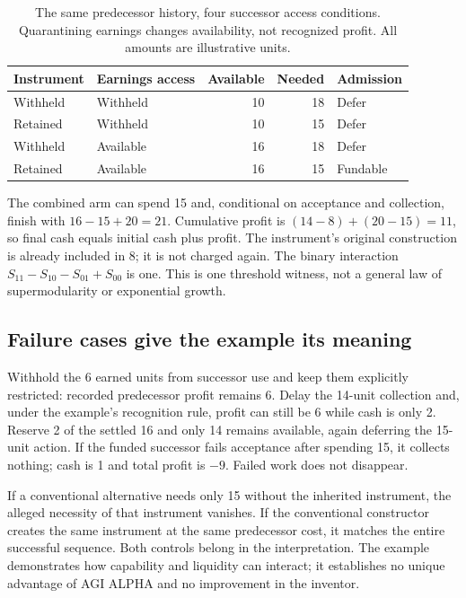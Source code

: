 \documentclass[10pt,a4paper]{article}
\begin{document}
\begin{table}[htbp]
\centering\small
\caption{The same predecessor history, four successor access conditions. Quarantining earnings changes availability, not recognized profit. All amounts are illustrative units.}
\label{tab:factorial}
\begin{tabular}{@{}llrrl@{}}
\toprule
\textbf{Instrument} & \textbf{Earnings access} & \textbf{Available} & \textbf{Needed} & \textbf{Admission}\\
\midrule
Withheld & Withheld & 10 & 18 & Defer\\
Retained & Withheld & 10 & 15 & Defer\\
Withheld & Available & 16 & 18 & Defer\\
Retained & Available & 16 & 15 & Fundable\\
\bottomrule
\end{tabular}
\end{table}

The combined arm can spend 15 and, conditional on acceptance and collection, finish with $16-15+20=21$. Cumulative profit is $(14-8)+(20-15)=11$, so final cash equals initial cash plus profit. The instrument's original construction is already included in 8; it is not charged again. The binary interaction $S_{11}-S_{10}-S_{01}+S_{00}$ is one. This is one threshold witness, not a general law of supermodularity or exponential growth.

\subsection{Failure cases give the example its meaning}

Withhold the 6 earned units from successor use and keep them explicitly restricted: recorded predecessor profit remains 6. Delay the 14-unit collection and, under the example's recognition rule, profit can still be 6 while cash is only 2. Reserve 2 of the settled 16 and only 14 remains available, again deferring the 15-unit action. If the funded successor fails acceptance after spending 15, it collects nothing; cash is 1 and total profit is $-9$. Failed work does not disappear.

If a conventional alternative needs only 15 without the inherited instrument, the alleged necessity of that instrument vanishes. If the conventional constructor creates the same instrument at the same predecessor cost, it matches the entire successful sequence. Both controls belong in the interpretation. The example demonstrates how capability and liquidity can interact; it establishes no unique advantage of AGI ALPHA and no improvement in the inventor.
\end{document}
